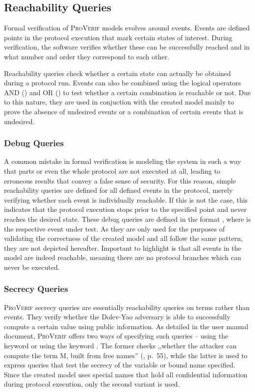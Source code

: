 \subsection{Reachability Queries}

Formal verification of \textsc{ProVerif} models evolves around events.
Events are defined points in the protocol execution that mark certain states of interest.
During verification, the software verifies whether these can be successfully reached and in what number and order they correspond to each other.

Reachability queries check whether a certain state can actually be obtained during a protocol run.
Events can also be combined using the logical operators AND ({\sffamily{\&\&}}) and OR ({\sffamily{||}}) to test whether a certain combination is reachable or not.
Due to this nature, they are used in conjuction with the created model mainly to prove the absence of undesired events or a combination of certain events that is undesired.

\subsubsection{Debug Queries}
\label{ssec:debug}

A common mistake in formal verification is modeling the system in such a way that parts or even the whole protocol are not executed at all, leading to erroneous results that convey a false sense of security.
For this reason, simple reachability queries are defined for all defined events in the protocol, merely verifying whether each event is individually reachable.
If this is not the case, this indicates that the protocol execution stops prior to the specified point and never reaches the desired state.
These debug queries are defined in the format {}, where {} is the respective event under test.
As they are only used for the purposes of validating the correctness of the created model and all follow the same pattern, they are not depicted hereafter.
Important to highlight is that all events in the model are indeed reachable, meaning there are no protocol branches which can never be executed.

\subsubsection{Secrecy Queries}
\label{ssec:secrecy}

\textsc{ProVerif} secrecy queries are essentially reachability queries on terms rather than events.
They verify whether the Dolev-Yao adversary is able to successfully compute a certain value using public information.
As detailed in the user manual document, \textsc{ProVerif} offers two ways of specifying such queries -- using the keyword {} or using the keyword {}.
The former checks ,,whether the attacker can compute the term M, built from free names'' (\cite{blanchet2020proverif}, p.~55), while the latter is used to express queries that test the secrecy of the variable or bound name specified.
Since the created model uses special names that hold all confidential information during protocol execution, only the second variant is used.

